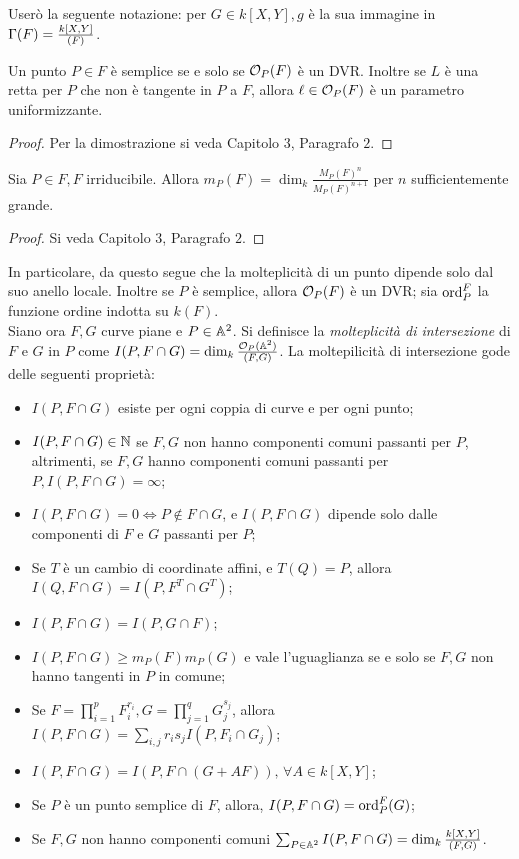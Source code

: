             Userò la seguente notazione: per $G \in k[X,Y], g$ è la sua immagine in $\Gamma(F) = \frac{k[X,Y]}{(F)}$.
            \begin{proposizione}
                Un punto $P \in F$ è semplice se e solo se $\mathcal{O}_P(F)$ è un DVR. Inoltre se $L$ è una retta per $P$ che non è tangente in $P$ a $F$, allora $\ell \in \mathcal{O}_P(F)$ è un parametro uniformizzante. 
            \end{proposizione}
            \begin{proof}
                Per la dimostrazione si veda \cite{fulton} Capitolo $3$, Paragrafo $2$.
            \end{proof}
            \begin{proposizione}
                Sia $P \in F, F$ irriducibile. Allora $m_P(F) = \dim_k \frac{M_P(F)^n}{M_P(F)^{n+1}}$ per $n$ sufficientemente grande.
            \end{proposizione}
            \begin{proof}
                Si veda \cite{fulton} Capitolo $3$, Paragrafo $2$.
            \end{proof}
            In particolare, da questo segue che la molteplicità di un punto dipende solo dal suo anello locale. Inoltre se $P$ è semplice, allora $\mathcal{O}_P(F)$ è un DVR; sia $\operatorname{ord}_P^F$ la funzione ordine indotta su $k(F)$. \\
            Siano ora $F,G$ curve piane e $P \in \mathbb{A}^2$. Si definisce la \emph{molteplicità di intersezione} di $F$ e $G$ in $P$ come $I(P,F \cap G) = \dim_k \frac{\mathcal{O}_P(\mathbb{A}^2)}{(F,G)}$. La moltepilicità di intersezione gode 
            delle seguenti proprietà: \begin{itemize}
                \item $I(P,F\cap G)$ esiste per ogni coppia di curve e per ogni punto;
                \item $I(P, F \cap G) \in \mathbb{N}$ se $F,G$ non hanno componenti comuni passanti per $P$, altrimenti, se $F,G$ hanno componenti comuni passanti per $P, I(P,F \cap G) = \infty$;
                \item $I(P,F \cap G) = 0 \iff P \notin F \cap G$, e $I(P,F \cap G)$ dipende solo dalle componenti di $F$ e $G$ passanti per $P$;
                \item Se $T$ è un cambio di coordinate affini, e $T(Q) = P$, allora $I(Q,F \cap G) = I(P, F^T \cap G^T)$;
                \item $I(P,F \cap G) = I(P,G \cap F)$;
                \item $I(P,F \cap G) \geq m_P(F)m_P(G)$ e vale l'uguaglianza se e solo se $F,G$ non hanno tangenti in $P$ in comune;
                \item Se $F = \prod_{i=1}^p F_i^{r_i}, G = \prod_{j=1}^q G_j^{s_j}$, allora $I(P,F \cap G) = \sum_{i,j}r_is_jI(P,F_i \cap G_j)$;
                \item $I(P,F \cap G) = I(P, F \cap (G + AF)), \, \forall A \in k[X,Y]$;
                \item Se $P$ è un punto semplice di $F$, allora, $I(P,F \cap G) = \operatorname{ord}_P^F(G)$;
                \item Se $F,G$ non hanno componenti comuni $\sum_{P \in \mathbb{A}^2} I(P,F \cap G) = \dim_k \frac{k[X,Y]}{(F,G)}$.
            \end{itemize}
